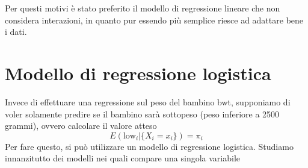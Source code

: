 \documentclass{article}\usepackage[]{graphicx}\usepackage[]{color}
\begin{document}
Per questi motivi è stato preferito il modello di regressione lineare che non considera interazioni, in quanto pur essendo più semplice riesce ad adattare bene i dati.

\section{Modello di regressione logistica}
\label{sec:logistica}

Invece di effettuare una regressione sul peso del bambino bwt, supponiamo di voler solamente predire se il bambino sarà sottopeso (peso inferiore a 2500 grammi), ovvero calcolare il valore atteso
$$E(\text{low}_i | \{X_i = x_i\}) = \pi_i$$
Per fare questo, si può utilizzare un modello di regressione logistica.
Studiamo innanzitutto dei modelli nei quali compare una singola variabile
\end{document}
